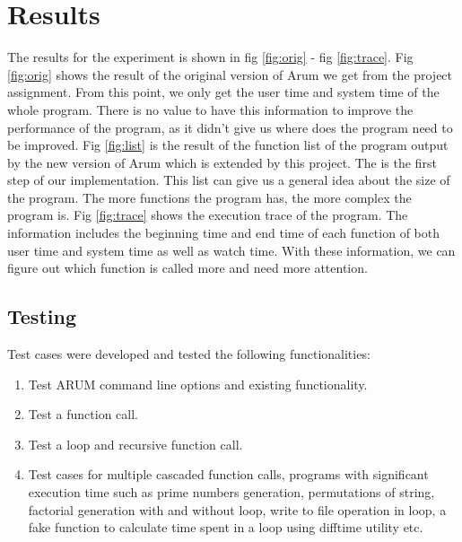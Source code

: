\documentclass[11pt,letterpaper,oneside]{article}
\begin{document}
\section{Results}
\label{sec:results}

The results for the experiment is shown in fig \ref{fig:orig} - fig \ref{fig:trace}. Fig \ref{fig:orig} shows the result of the original version of Arum we get from the project assignment. From this point, we only get the user time and system time of the whole program. There is no value to have this information to improve the performance of the program, as it didn't give us where does the program need to be improved. Fig \ref{fig:list} is the result of the function list of the program output by the new version of Arum which is extended by this project. The is the first step of our implementation. This list can give us a general idea about the size of the program. The more functions the program has, the more complex the program is. Fig \ref{fig:trace} shows the execution trace of the program. The information includes the beginning time and end time of each function of both user time and system time as well as watch time. With these information, we can figure out which function is called more and need more attention.

\subsection{Testing}

Test cases were developed and tested the following functionalities:
\begin{enumerate}
\item Test ARUM command line options and existing functionality.
\item Test a function call.
\item Test a loop and recursive function call.
\item Test cases for multiple cascaded function calls, programs with significant execution time such as prime numbers generation, permutations of string, factorial generation with and without loop, write to file operation in loop,  a fake function to calculate time spent in a loop using difftime utility etc. 
\end{enumerate}
\end{document}

